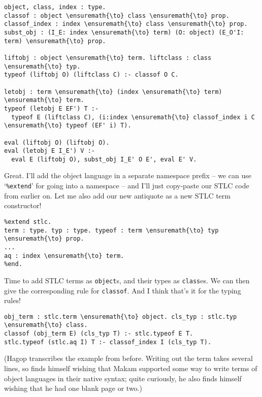 \begin{verbatim}
object, class, index : type.
classof : object \ensuremath{\to} class \ensuremath{\to} prop.
classof_index : index \ensuremath{\to} class \ensuremath{\to} prop.
subst_obj : (I_E: index \ensuremath{\to} term) (O: object) (E_O'I: term) \ensuremath{\to} prop.

liftobj : object \ensuremath{\to} term. liftclass : class \ensuremath{\to} typ.
typeof (liftobj O) (liftclass C) :- classof O C.

letobj : term \ensuremath{\to} (index \ensuremath{\to} term) \ensuremath{\to} term.
typeof (letobj E EF') T :-
  typeof E (liftclass C), (i:index \ensuremath{\to} classof_index i C \ensuremath{\to} typeof (EF' i) T).

eval (liftobj O) (liftobj O).
eval (letobj E I_E') V :-
  eval E (liftobj O), subst_obj I_E' O E', eval E' V.
\end{verbatim}

\heroADVISOR{} Great. I'll add the object language in a separate namespace
prefix -- we can use `\texttt{\%extend}' for going into a namespace --
and I'll just copy-paste our STLC code from earlier on. Let me also add
our new antiquote as a new STLC term constructor!

\begin{verbatim}
%extend stlc.
term : type. typ : type. typeof : term \ensuremath{\to} typ \ensuremath{\to} prop.
...
aq : index \ensuremath{\to} term.
%end.
\end{verbatim}

\heroSTUDENT{} Time to add STLC terms as \texttt{object}s, and their types as
\texttt{class}es. We can then give the corresponding rule for
\texttt{classof}. And I think that's it for the typing rules!

\begin{verbatim}
obj_term : stlc.term \ensuremath{\to} object. cls_typ : stlc.typ \ensuremath{\to} class.
classof (obj_term E) (cls_typ T) :- stlc.typeof E T.
stlc.typeof (stlc.aq I) T :- classof_index I (cls_typ T).
\end{verbatim}

\begin{scenecomment}
(Hagop transcribes the example from before. Writing out the term takes several lines, so finds himself
wishing that Makam supported some way to write terms of object languages in their native syntax;
quite curiously, he also finds himself wishing that he had one blank page or two.)
\end{scenecomment}

